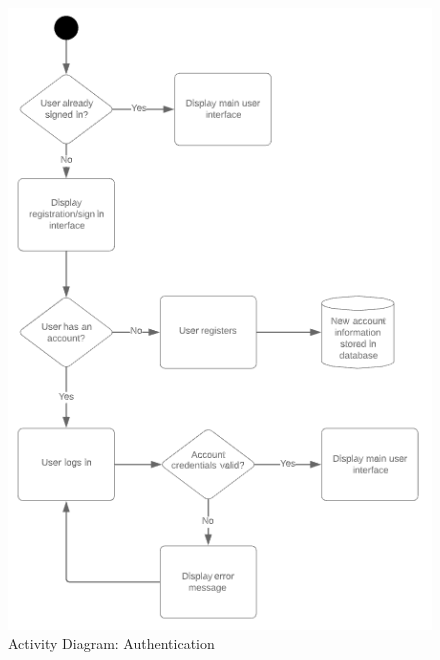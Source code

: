         \begin{figure}[!h]
            \center
            \includegraphics[width=120mm]{../figures/ActivityDiagramAuthentication}
            \caption{Activity Diagram: Authentication}
        \end{figure}

        \pagebreak

